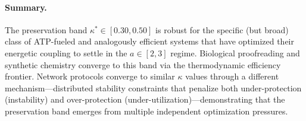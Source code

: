 \documentclass[11pt,twocolumn]{article}
\begin{document}
\paragraph{Summary.} The preservation band $\kappa^* \in [0.30, 0.50]$ is robust for the specific (but broad) class of ATP-fueled and analogously efficient systems that have optimized their energetic coupling to settle in the $a \in [2, 3]$ regime. Biological proofreading and synthetic chemistry converge to this band via the thermodynamic efficiency frontier. Network protocols converge to similar $\kappa$ values through a different mechanism---distributed stability constraints that penalize both under-protection (instability) and over-protection (under-utilization)---demonstrating that the preservation band emerges from multiple independent optimization pressures.

\FloatBarrier

\end{document}
